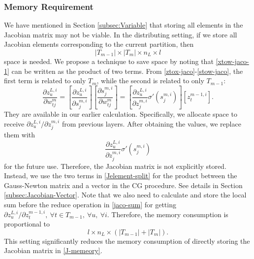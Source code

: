 \documentclass[12pt]{article}
\begin{document}
\subsubsection{Memory Requirement}
\label{subsubsec:Jmemory}
We have mentioned in Section \ref{subsec:Variable} that storing all elements in the Jacobian matrix may not be viable.
In the distributing setting, if we store all Jacobian elements corresponding to the current partition, then 
\begin{equation}
\label{J-memeory}
|T_{m-1}| \times |T_m| \times n_L \times l
\end{equation} 
space is needed. We propose a technique to save space by noting that \eqref{xtow-jaco-1} can be written as the product of two terms. 
From \eqref{ztox-jaco}-\eqref{stow-jaco}, the first term is related to only $T_m$, while the second is
related to only $T_{m-1}$:
\begin{equation}
\label{Jelement-split}
\frac{\partial z^{L,i}_u}{\partial w^m_{tj}} 
=[\frac{\partial z^{L,i}_u}{\partial s^{m,i}_j}][\frac{\partial s^{m,i}_j}{\partial w^m_{tj}}]
=[\frac{\partial z^{L,i}_u}{\partial z^{m,i}_j} \sigma'(s^{m,i}_j)][z^{m-1,i}_t].
\end{equation}
They are available in our earlier calculation. 
Specifically, we allocate space to receive $\partial z^{L,i}_u/\partial z^{m,i}_j$ from previous layers. After obtaining the values, we
replace them with 
\begin{equation}
\label{Jelement-store}
\frac{\partial z^{L,i}_u}{\partial z^{m,i}_j} \sigma'(s^{m,i}_j)
\end{equation}
for the future use. Therefore, the Jacobian matrix is not explicitly stored. Instead, we use the two terms in \eqref{Jelement-split} for the product between the Gauss-Newton matrix and a vector in the CG procedure. See details in Section \ref{subsec:Jacobian-Vector}.
Note that we also need to calculate and store the local sum 
before the reduce operation in \eqref{jaco-sum} for getting $\partial z^{L,i}_u/\partial z^{m-1,i}_t,\ \forall t \in T_{m-1},\ \forall u,\ \forall i$. 
Therefore, the memory consumption is proportional to
\begin{equation*}
	l \times n_L \times ( |T_{m-1}| + |T_m|).
\end{equation*}
This setting significantly reduces the memory consumption of directly storing the Jacobian matrix in \eqref{J-memeory}.
\end{document}

